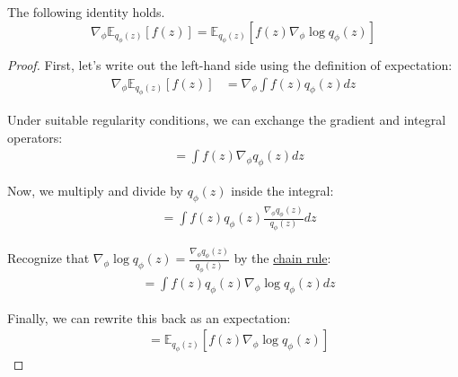 \documentclass{article}
\begin{document}
  \begin{lemma}
    \label{thm:log-derivative-trick}
    The following identity holds. 
    \begin{equation}
      \nabla_\phi \mathbb{E}_{q_\phi(z)}[f(z)] = \mathbb{E}_{q_\phi(z)}[f(z)\nabla_\phi \log q_\phi(z)]
    \end{equation}
  \end{lemma}
  \begin{proof}
    First, let's write out the left-hand side using the definition of expectation:
    \begin{align*}
    \nabla_\phi \mathbb{E}_{q_\phi(z)}[f(z)] &= \nabla_\phi \int f(z)q_\phi(z)dz
    \end{align*}

    Under suitable regularity conditions, we can exchange the gradient and integral operators:
    \begin{align*}
    &= \int f(z)\nabla_\phi q_\phi(z)dz
    \end{align*}

    Now, we multiply and divide by $q_\phi(z)$ inside the integral:
    \begin{align*}
    &= \int f(z) q_\phi(z) \frac{\nabla_\phi q_\phi(z)}{q_\phi(z)} dz
    \end{align*}

    Recognize that $\nabla_\phi \log q_\phi(z) = \frac{\nabla_\phi q_\phi(z)}{q_\phi(z)}$ by the \hyperref[mv-thm:chain-rule]{chain rule}:
    \begin{align*}
    &= \int f(z) q_\phi(z) \nabla_\phi \log q_\phi(z) dz
    \end{align*}

    Finally, we can rewrite this back as an expectation:
    \begin{align*}
    &= \mathbb{E}_{q_\phi(z)}[f(z)\nabla_\phi \log q_\phi(z)]
    \end{align*}
  \end{proof}
\end{document}
